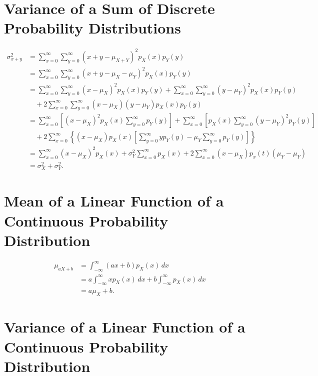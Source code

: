 \documentclass{myart}
\newcommand{\intr}{\int_{-\infty}^\infty}
\newcommand{\dx}{\,dx}
\newcommand{\mean}{\mu}
\newcommand{\variance}{\sigma^2}
\begin{document}
\section{Variance of a Sum of Discrete Probability Distributions}

\begin{align*}
   \variance_{x+y}
&= \sum_{x=0}^\infty \sum_{y=0}^\infty
     (x + y - \mean_{X+Y})^2 p_X(x) p_Y(y) \\
&= \sum_{x=0}^\infty \sum_{y=0}^\infty
     (x + y - \mean_X - \mean_Y)^2 p_X(x) p_Y(y) \\
&= \sum_{x=0}^\infty \sum_{y=0}^\infty
     (x - \mean_X)^2 p_X(x) p_Y(y)
   + \sum_{x=0}^\infty \sum_{y=0}^\infty
       (y - \mean_Y)^2 p_X(x) p_Y(y) \\
&\quad + 2 \sum_{x=0}^\infty \sum_{y=0}^\infty
             (x - \mean_X)(y - \mean_Y) p_X(x) p_Y(y) \\
&=   \sum_{x=0}^\infty \left[(x - \mean_X)^2 p_X(x)
       \sum_{y=0}^\infty p_Y(y)\right]
   + \sum_{x=0}^\infty \left[p_X(x)
       \sum_{y=0}^\infty (y - \mean_Y)^2 p_Y(y)\right] \\
&\quad + 2 \sum_{x=0}^\infty \left\{(x - \mean_X) p_X(x)
             \left[\sum_{y=0}^\infty y p_Y(y)
       - \mean_Y \sum_{y=0}^\infty p_Y(y) \right]\right\} \\
&=   \sum_{x=0}^\infty (x - \mean_X)^2 p_X(x)
   + \variance_Y \sum_{x=0}^\infty p_X(x)
   + 2 \sum_{x=0}^\infty (x - \mean_X)
         p_x(t) (\mean_Y - \mean_Y) \\
&= \variance_X + \variance_Y.
\end{align*}

\section{Mean of a Linear Function of a Continuous Probability
  Distribution}

\begin{align*}
\mean_{aX + b} &= \intr (ax + b) p_X(x) \dx \\
&= a \intr x p_X(x) \dx + b \intr p_X(x) \dx \\
&= a\mean_X + b.
\end{align*}

\section{Variance of a Linear Function of a Continuous Probability
  Distribution}
\end{document}
